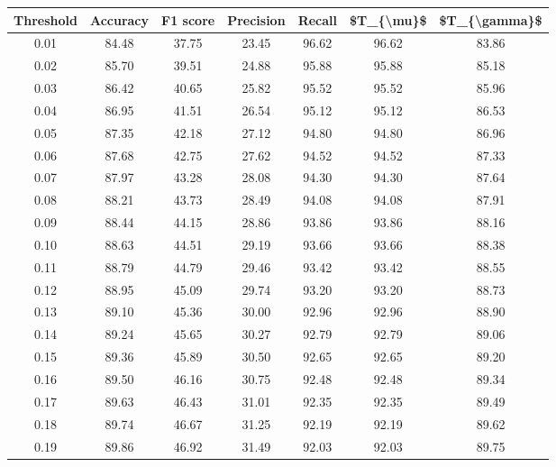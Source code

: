 \begin{tabular}{|c|c|c|c|c|c|c|}
\hline
 Threshold &  Accuracy &  F1 score &  Precision &  Recall &  \$T\_\{\textbackslash mu\}\$ &  \$T\_\{\textbackslash gamma\}\$ \\
\hline
      0.01 &     84.48 &     37.75 &      23.45 &   96.62 &      96.62 &         83.86 \\
      0.02 &     85.70 &     39.51 &      24.88 &   95.88 &      95.88 &         85.18 \\
      0.03 &     86.42 &     40.65 &      25.82 &   95.52 &      95.52 &         85.96 \\
      0.04 &     86.95 &     41.51 &      26.54 &   95.12 &      95.12 &         86.53 \\
      0.05 &     87.35 &     42.18 &      27.12 &   94.80 &      94.80 &         86.96 \\
      0.06 &     87.68 &     42.75 &      27.62 &   94.52 &      94.52 &         87.33 \\
      0.07 &     87.97 &     43.28 &      28.08 &   94.30 &      94.30 &         87.64 \\
      0.08 &     88.21 &     43.73 &      28.49 &   94.08 &      94.08 &         87.91 \\
      0.09 &     88.44 &     44.15 &      28.86 &   93.86 &      93.86 &         88.16 \\
      0.10 &     88.63 &     44.51 &      29.19 &   93.66 &      93.66 &         88.38 \\
      0.11 &     88.79 &     44.79 &      29.46 &   93.42 &      93.42 &         88.55 \\
      0.12 &     88.95 &     45.09 &      29.74 &   93.20 &      93.20 &         88.73 \\
      0.13 &     89.10 &     45.36 &      30.00 &   92.96 &      92.96 &         88.90 \\
      0.14 &     89.24 &     45.65 &      30.27 &   92.79 &      92.79 &         89.06 \\
      0.15 &     89.36 &     45.89 &      30.50 &   92.65 &      92.65 &         89.20 \\
      0.16 &     89.50 &     46.16 &      30.75 &   92.48 &      92.48 &         89.34 \\
      0.17 &     89.63 &     46.43 &      31.01 &   92.35 &      92.35 &         89.49 \\
      0.18 &     89.74 &     46.67 &      31.25 &   92.19 &      92.19 &         89.62 \\
      0.19 &     89.86 &     46.92 &      31.49 &   92.03 &      92.03 &         89.75 \\

\end{tabular}
